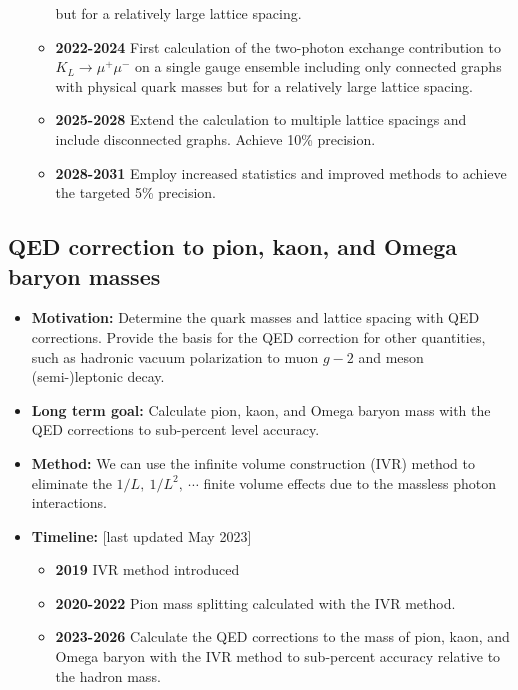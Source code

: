 \documentclass[12pt,hyperpdf]{article}
\begin{document}
\begin{itemize}
\begin{itemize}
    but for a relatively large lattice spacing.~\cite{Zhao:2022pbs, Zhao:2022njd}
    \item{\bf 2022-2024} First calculation of the two-photon exchange contribution 
    to $K_L\to\mu^+ \mu^-$ on a single gauge ensemble including only connected 
    graphs with physical quark masses but for a relatively large lattice spacing.
    \item{\bf 2025-2028} Extend the calculation to multiple lattice spacings and include 
    disconnected graphs.  Achieve 10\% precision.
    \item{\bf 2028-2031} Employ increased statistics and improved methods to 
    achieve the targeted 5\% precision.
\end{itemize}
\end{itemize}

\subsection{QED correction to pion, kaon, and Omega baryon masses}
\begin{itemize}
    \item{\bf Motivation:} Determine the quark masses and lattice spacing with QED corrections. Provide the basis for the QED correction for other quantities, such as hadronic vacuum polarization to muon $g-2$ and meson (semi-)leptonic decay.
    \item{\bf Long term goal:} Calculate pion, kaon, and Omega baryon mass with the QED corrections to sub-percent level accuracy.
    \item{\bf Method:}
      We can use the infinite volume construction (IVR) method \cite{Feng:2018qpx} to eliminate
      the $1/L,~1/L^2,~\cdots$ finite volume effects due to the massless photon interactions.
\item{\bf Timeline:} \hfill [last updated May 2023]
\begin{itemize}
    \item{\bf 2019} IVR method introduced
    \item{\bf 2020-2022} Pion mass splitting calculated with the IVR method.
    \item{\bf 2023-2026} Calculate the QED corrections to the mass of pion, kaon, and Omega baryon with the IVR method to sub-percent accuracy relative to the hadron mass.
\end{itemize}
\end{itemize}
\end{document}
